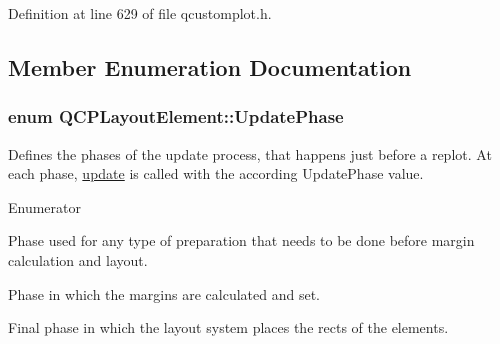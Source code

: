 Definition at line 629 of file qcustomplot.\+h.



\subsection{Member Enumeration Documentation}
\hypertarget{class_q_c_p_layout_element_a0d83360e05735735aaf6d7983c56374d}{}
\subsubsection[{Update\+Phase}]{\setlength{\rightskip}{0pt plus 5cm}enum {\bf Q\+C\+P\+Layout\+Element\+::\+Update\+Phase}}\label{class_q_c_p_layout_element_a0d83360e05735735aaf6d7983c56374d}
Defines the phases of the update process, that happens just before a replot. At each phase, \hyperlink{class_q_c_p_layout_element_a929c2ec62e0e0e1d8418eaa802e2af9b}{update} is called with the according Update\+Phase value. \begin{Desc}
\item[Enumerator]\par
\begin{description}
\item[{\em 
\hypertarget{class_q_c_p_layout_element_a0d83360e05735735aaf6d7983c56374dad6119882eba136357c2f627992e527d3}{}up\+Preparation\label{class_q_c_p_layout_element_a0d83360e05735735aaf6d7983c56374dad6119882eba136357c2f627992e527d3}
}]Phase used for any type of preparation that needs to be done before margin calculation and layout. \item[{\em 
\hypertarget{class_q_c_p_layout_element_a0d83360e05735735aaf6d7983c56374da288cb59a92280e47261a341f2813e676}{}up\+Margins\label{class_q_c_p_layout_element_a0d83360e05735735aaf6d7983c56374da288cb59a92280e47261a341f2813e676}
}]Phase in which the margins are calculated and set. \item[{\em 
\hypertarget{class_q_c_p_layout_element_a0d83360e05735735aaf6d7983c56374da5d1ccf5d79967c232c3c511796860045}{}up\+Layout\label{class_q_c_p_layout_element_a0d83360e05735735aaf6d7983c56374da5d1ccf5d79967c232c3c511796860045}
}]Final phase in which the layout system places the rects of the elements. \end{description}
\end{Desc}


